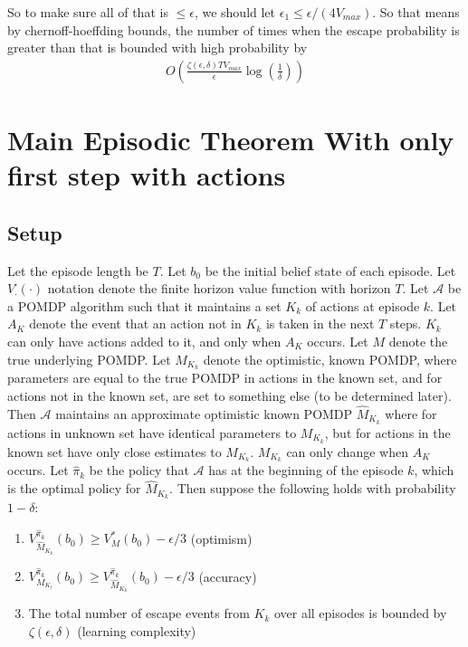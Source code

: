 \documentclass[10pt,english]{article}
\begin{document}
So to make sure all of that is $\leq \epsilon$, we should let $\epsilon_1 \leq \epsilon/(4V_{max})$. So that means by chernoff-hoeffding bounds, the number of times when the escape probability is greater than that is bounded with high probability by
\begin{align}
O\left(\frac{\zeta(\epsilon,\delta)TV_{max}}{\epsilon}\log\left(\frac{1}{\delta}\right)\right)
\end{align}



\section{Main Episodic Theorem With only first step with actions}

\subsection{Setup}

Let the episode length be $T$. Let $b_0$ be the initial belief state of each episode. Let $V_{\cdot}^{\cdot}(\cdot)$ notation denote the finite horizon value function with horizon $T$. Let $\mathcal{A}$ be a POMDP algorithm such that it maintains a set $K_k$ of actions at episode $k$. Let $A_K$ denote the event that an action not in $K_k$ is taken in the next $T$ steps. $K_k$ can only have actions added to it, and only when $A_K$ occurs. Let $M$ denote the true underlying POMDP. Let $M_{K_k}$ denote the optimistic, known POMDP, where parameters are equal to the true POMDP in actions in the known set, and for actions not in the known set, are set to something else (to be determined later). Then $\mathcal{A}$ maintains an approximate optimistic known POMDP $\widehat{M}_{K_k}$ where for actions in unknown set have identical parameters to $M_{K_k}$, but for actions in the known set have only close estimates to $M_{K_k}$. $M_{K_k}$ can only change when $A_K$ occurs. Let $\widehat{\pi}_k$ be the policy that $\mathcal{A}$ has at the beginning of the episode $k$, which is the optimal policy for $\widehat{M}_{K_k}$. Then suppose the following holds with probability $1-\delta$:

\begin{enumerate}
	\item $V^{\widehat{\pi}_k}_{\widehat{M}_{K_k}}(b_0) \geq V^{*}_M(b_0) - \epsilon/3$ (optimism)
	\item $V^{\widehat{\pi}_k}_{M_{K_t}}(b_0) \geq V^{\widehat{\pi}_k}_{\widehat{M}_{K_k}}(b_0) -\epsilon/3$ (accuracy)
	\item The total number of escape events from $K_k$ over all episodes is bounded by $\zeta(\epsilon,\delta)$ (learning complexity)
\end{enumerate}
\end{document}
